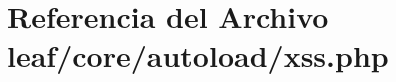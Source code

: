 \hypertarget{xss_8php}{\section{Referencia del Archivo leaf/core/autoload/xss.php}
\label{xss_8php}
}
